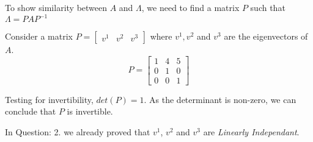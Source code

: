\documentclass[a4paper]{article}
\begin{document}
\begin{qalist}
			To show similarity between $A$ and $\Lambda$, we need to find a matrix $P$ such that $\Lambda = P A {P}^{-1}$
			
			Consider a matrix $P = \begin{bmatrix} {v}^{1} & {v}^{2} & {v}^{3}\end{bmatrix}$ where ${v}^{1}, {v}^{2}$ and ${v}^{3}$ are the eigenvectors of $A$. 
			\begin{equation}\label{q5P}
				P = 
					\begin{bmatrix}
						1 & 4 & 5 \\
						0 & 1 & 0 \\
						0 & 0 & 1
					\end{bmatrix}
			\end{equation}
			
			Testing for invertibility, $det(P) = 1$. As the determinant is non-zero, we can conclude that $P$ is invertible.
			
			In Question: 2. we already proved that ${v}^{1}$, ${v}^{2}$ and ${v}^{3}$ are \textit{Linearly Independant}.
			

\end{qalist}
\end{document}
